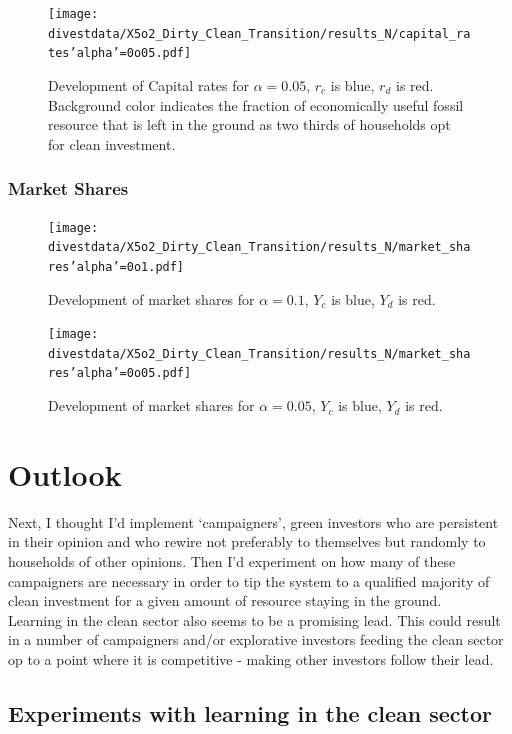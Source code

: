\begin{figure}[H]
	\centering
	\texttt{[image: divestdata/X5o2\_Dirty\_Clean\_Transition/results\_N/capital\_rates'alpha'=0o05.pdf]}
	\caption{Development of Capital rates for $\alpha=0.05$, $r_c$ is blue, $r_d$ is red. Background color indicates the fraction of economically useful fossil resource that is left in the ground as two thirds of households opt for clean investment.}

\end{figure}
\subsubsection{Market Shares}
\begin{figure}[H]
	\centering
	\texttt{[image: divestdata/X5o2\_Dirty\_Clean\_Transition/results\_N/market\_shares'alpha'=0o1.pdf]}
	\caption{Development of market shares for $\alpha=0.1$, $Y_c$ is blue, $Y_d$ is red.}

\end{figure}

\begin{figure}[H]
	\centering
	\texttt{[image: divestdata/X5o2\_Dirty\_Clean\_Transition/results\_N/market\_shares'alpha'=0o05.pdf]}
	\caption{Development of market shares for $\alpha=0.05$, $Y_c$ is blue, $Y_d$ is red.}

\end{figure}

\section{Outlook}
Next, I thought I'd implement `campaigners', green investors who are persistent in their opinion and who rewire not preferably to themselves but randomly to households of other opinions. Then I'd experiment on how many of these campaigners are necessary in order to tip the system to a qualified majority of clean investment for a given amount of resource staying in the ground. \\

Learning in the clean sector also seems to be a promising lead. This could result in a number of campaigners and/or explorative investors feeding the clean sector op to a point where it is competitive - making other investors follow their lead.

\subsection{Experiments with learning in the clean sector}

